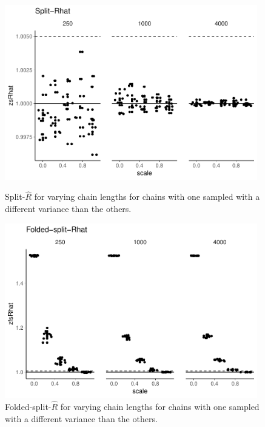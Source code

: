 \documentclass[american,]{article}
\begin{document}
\begin{figure}[tp]
  \centering
  \begin{minipage}{0.48\textwidth}
  \includegraphics[width=0.98\textwidth]{graphics/zsrhat-scaled-chain-1.pdf}
  \caption{Split-\(\widehat{R}\) for varying chain lengths
    for chains with one sampled with a different variance than the others.}
  \label{fig:zsrhat-scaled-chain-1}
\end{minipage}
\hfill
  \begin{minipage}{0.48\textwidth}
  \includegraphics[width=0.98\textwidth]{graphics/zfsrhat-scaled-chain-1.pdf}
  \caption{Folded-split-\(\widehat{R}\) for varying chain lengths
    for chains with one sampled with a different variance than the others.}
  \label{fig:zfsrhat-scaled-chain-1}
\end{minipage}
\end{figure}
\end{document}
